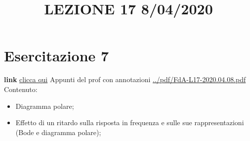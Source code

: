 \section{Esercitazione 7}
\title{LEZIONE 17 8/04/2020}\newline
\textbf{link} \href{https://web.microsoftstream.com/video/5d3f8bd1-ee8b-420b-802f-14dfed0bd278?list=user&userId=faa91214-a6f5-40d7-8875-253fd49b8ce1}{clicca qui}\newline
\newline
Appunti del prof con annotazioni \url{../pdf/FdA-L17-2020.04.08.pdf}\newline
Contenuto:
\begin{itemize}
    \item Diagramma polare;
    \item Effetto di un ritardo sulla risposta in frequenza e sulle sue rappresentazioni (Bode e diagramma polare);
\end{itemize}